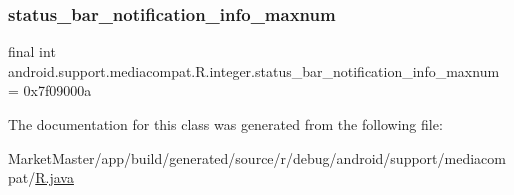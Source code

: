 \mbox{\label{classandroid_1_1support_1_1mediacompat_1_1R_1_1integer_a8eff02253ecf97f438548fe224122338}} 
\subsubsection{\texorpdfstring{status\+\_\+bar\+\_\+notification\+\_\+info\+\_\+maxnum}{status\_bar\_notification\_info\_maxnum}}
{\footnotesize\ttfamily final int android.\+support.\+mediacompat.\+R.\+integer.\+status\+\_\+bar\+\_\+notification\+\_\+info\+\_\+maxnum = 0x7f09000a\hspace{0.3cm}{\ttfamily [static]}}



The documentation for this class was generated from the following file\+:\begin{DoxyCompactItemize}
\item 
Market\+Master/app/build/generated/source/r/debug/android/support/mediacompat/\mbox{\hyperlink{debug_2android_2support_2mediacompat_2R_8java}{R.\+java}}\end{DoxyCompactItemize}

